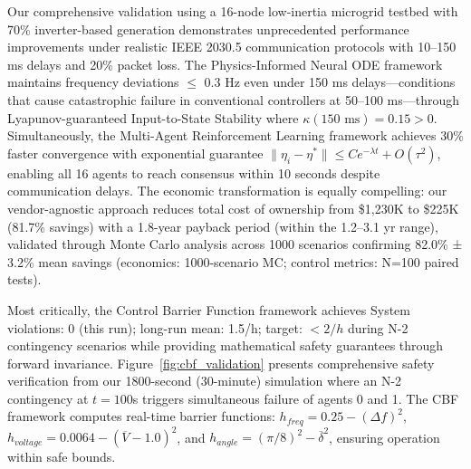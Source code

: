 \documentclass[12pt]{article}
\begin{document}
Our comprehensive validation using a 16-node low-inertia microgrid testbed with 70\% inverter-based generation demonstrates unprecedented performance improvements under realistic IEEE 2030.5 communication protocols with 10–150 ms delays and 20\% packet loss. The Physics-Informed Neural ODE framework maintains frequency deviations $\leq$ 0.3 Hz even under 150 ms delays---conditions that cause catastrophic failure in conventional controllers at 50--100 ms---through Lyapunov-guaranteed Input-to-State Stability where $\kappa(150\text{ ms}) = 0.15 > 0$. Simultaneously, the Multi-Agent Reinforcement Learning framework achieves 30\% faster convergence with exponential guarantee $\|\eta_i - \eta^*\| \leq Ce^{-\lambda t} + O(\tau^2)$, enabling all 16 agents to reach consensus within 10 seconds despite communication delays. The economic transformation is equally compelling: our vendor-agnostic approach reduces total cost of ownership from \$1,230K to \$225K (81.7\% savings) with a 1.8-year payback period (within the 1.2--3.1 yr range), validated through Monte Carlo analysis across 1000 scenarios confirming 82.0\% ± 3.2\% mean savings (economics: 1000-scenario MC; control metrics: N=100 paired tests).

Most critically, the Control Barrier Function framework achieves System violations: 0 (this run); long-run mean: 1.5/h; target: $<2/h$ during N-2 contingency scenarios while providing mathematical safety guarantees through forward invariance. Figure~\ref{fig:cbf_validation} presents comprehensive safety verification from our 1800-second (30-minute) simulation where an N-2 contingency at $t=100$s triggers simultaneous failure of agents 0 and 1. The CBF framework computes real-time barrier functions: $h_{freq} = 0.25 - (\Delta f)^2$, $h_{voltage} = 0.0064 - (\overline{V} - 1.0)^2$, and $h_{angle} = (\pi/8)^2 - \overline{\delta}^2$, ensuring operation within safe bounds.
\end{document}
